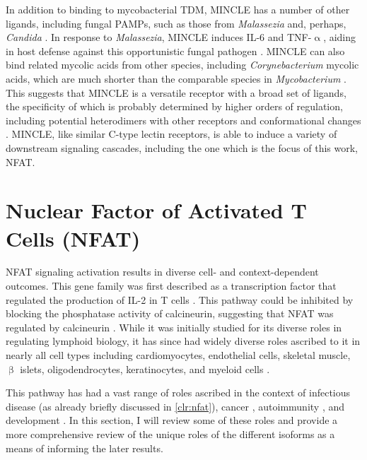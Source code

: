 In addition to binding to mycobacterial TDM, MINCLE has a number of other ligands, including fungal PAMPs, such as those from \textit{Malassezia} and, perhaps, \textit{Candida} \citep{Yamasaki2009, Wells2008, Ishikawa2013}. In response to \textit{Malassezia}, MINCLE induces IL\hyp{}6 and TNF\hyp{}$\upalpha$, aiding in host defense against this opportunistic fungal pathogen \citep{Lu2018}. MINCLE can also bind related mycolic acids from other species, including \textit{Corynebacterium} mycolic acids, which are much shorter than the comparable species in \textit{Mycobacterium} \citep{vanderPeet2015}. This suggests that MINCLE is a versatile receptor with a broad set of ligands, the specificity of which is probably determined by higher orders of regulation, including potential heterodimers with other receptors and conformational changes \citep{Jegouzo2014}. MINCLE, like similar C-type lectin receptors, is able to induce a variety of downstream signaling cascades, including the one which is the focus of this work, NFAT.

\section{Nuclear Factor of Activated T Cells (NFAT)}\label{NFAT}

NFAT signaling activation results in diverse cell\hyp{} and context\hyp{}dependent outcomes. This gene family was first described as a transcription factor that regulated the production of IL\hyp{}2 in T cells \citep{Shaw1988, Jain1993, Northrop1994}. This pathway could be inhibited by blocking the phosphatase activity of calcineurin, suggesting that NFAT was regulated by calcineurin \citep{Jain1993, Loh1996}. While it was initially studied for its diverse roles in regulating lymphoid biology, it has since had widely diverse roles ascribed to it in nearly all cell types including cardiomyocytes, endothelial cells, skeletal muscle, $\upbeta$ islets, oligodendrocytes, keratinocytes, and myeloid cells \citep{Horsley2002, Crabtree2002, Fric2012b, Kegley2001, Stevenson2001, Weider2018, AlDaraji2002, Muller2010}. 

This pathway has had a vast range of roles ascribed in the context of infectious disease (as already briefly discussed in \autoref{clr:nfat}), cancer \citep{Muller2010}, autoimmunity \citep{Park2020}, and development \citep{Horsley2002, Crabtree2002}. In this section, I will review some of these roles and provide a more comprehensive review of the unique roles of the different isoforms as a means of informing the later results. 

